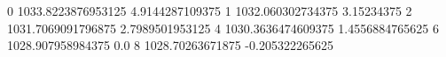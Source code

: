 0 1033.8223876953125 4.9144287109375
1 1032.060302734375 3.15234375
2 1031.7069091796875 2.7989501953125
4 1030.3636474609375 1.4556884765625
6 1028.907958984375 0.0
8 1028.70263671875 -0.205322265625
